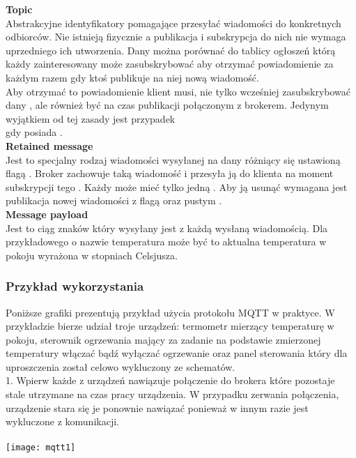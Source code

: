 \hypertarget{topic}{}
\textbf{Topic}\\
Abstrakcyjne identyfikatory pomagające przesyłać wiadomości do konkretnych odbiorców. Nie istnieją fizycznie a publikacja i subskrypcja do nich nie wymaga uprzedniego ich utworzenia. Dany  można porównać do tablicy ogłoszeń którą każdy zainteresowany może zasubskrybować aby otrzymać powiadomienie za każdym razem gdy ktoś publikuje na niej nową wiadomość.\\

Aby otrzymać to powiadomienie klient musi, nie tylko wcześniej zasubskrybować dany , ale również być na czas publikacji połączonym z brokerem. Jedynym wyjątkiem od tej zasady jest przypadek\\gdy {} posiada .\\

\hypertarget{retained message}{}
\textbf{Retained message}\\
Jest to specjalny rodzaj wiadomości wysyłanej na dany  różniący się ustawioną flagą . Broker zachowuje taką wiadomość i przesyła ją do klienta na moment subskrypcji tego . Każdy  może mieć tylko jedną . Aby ją usunąć wymagana jest publikacja nowej wiadomości z flagą  oraz pustym .\\

\hypertarget{message payload}{}
\textbf{Message payload}\\
Jest to ciąg znaków który wysyłany jest z każdą wysłaną wiadomością. Dla przykładowego  o nazwie temperatura może być to aktualna temperatura w pokoju wyrażona w stopniach Celsjusza.

\newpage

\subsubsection{Przykład wykorzystania}
Poniższe grafiki prezentują przykład użycia protokołu MQTT w praktyce. W przykładzie bierze udział troje urządzeń: termometr mierzący temperaturę w pokoju, sterownik ogrzewania mający za zadanie na podstawie zmierzonej temperatury włączać bądź wyłączać ogrzewanie oraz panel sterowania który dla uproszczenia został celowo wykluczony ze schematów.\\

1. Wpierw każde z urządzeń nawiązuje połączenie do brokera które pozostaje stale utrzymane na czas pracy urządzenia. W przypadku zerwania połączenia, urządzenie stara się je ponownie nawiązać ponieważ w innym razie jest wykluczone z komunikacji.\\\\
\texttt{[image: mqtt1]}\\\\

